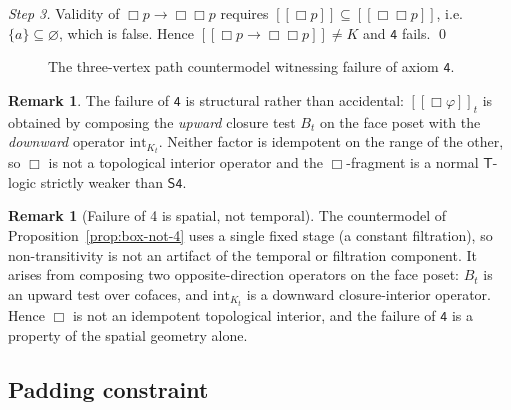 \documentclass[final,12pt]{elsarticle}
\newcommand{\llbracket}{[\![}
\newcommand{\rrbracket}{]\!]}
\theoremstyle{plain}
\theoremstyle{definition}
\newtheorem{rem}[thm]{Remark}
\begin{document}
\emph{Step 3.}  Validity of \(\Box p \to \Box\Box p\) requires
\(\llbracket \Box p \rrbracket \subseteq \llbracket \Box\Box p \rrbracket\),
i.e.\ \(\{a\} \subseteq \varnothing\), which is false.  Hence
\(\llbracket \Box p \to \Box\Box p \rrbracket \neq K\) and \(\mathsf{4}\)
fails.
\qed

\begin{figure}[htbp]
\centering
{}
\caption{The three-vertex path countermodel witnessing failure of axiom $\mathsf{4}$.}
\label{fig:path-countermodel}
\end{figure}

\begin{rem}
The failure of \(\mathsf{4}\) is structural rather than accidental:
\(\llbracket\Box\varphi\rrbracket_t\) is obtained by composing the
\emph{upward} closure test \(B_t\) on the face poset with the
\emph{downward} operator \(\mathrm{int}_{K_t}\).  Neither factor is
idempotent on the range of the other, so \(\Box\) is not a topological
interior operator and the \(\Box\)-fragment is a normal \(\mathsf{T}\)-logic
strictly weaker than \(\mathsf{S4}\).
\end{rem}

\begin{rem}[Failure of 4 is spatial, not temporal]
\label{rem:box-4-spatial}
The countermodel of Proposition~\ref{prop:box-not-4} uses a single fixed
stage (a constant filtration), so non-transitivity is not an artifact of
the temporal or filtration component.  It arises from composing two
opposite-direction operators on the face poset: \(B_t\) is an upward
test over cofaces, and \(\mathrm{int}_{K_t}\) is a downward
closure-interior operator.  Hence \(\Box\) is not an idempotent
topological interior, and the failure of \(\mathsf{4}\) is a property of
the spatial geometry alone.
\end{rem}

\subsection{Padding constraint}
\end{document}
